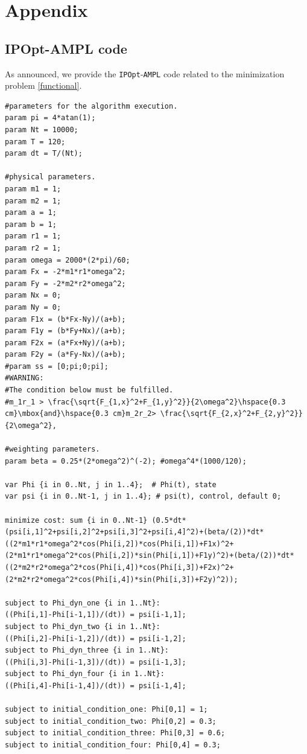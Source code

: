 \documentclass{aims}
\theoremstyle{definition}
\begin{document}
\newpage

\section*{Appendix}

\subsection{IPOpt-AMPL code}

As announced, we provide the \verb!IPOpt!-\verb!AMPL! code related to the minimization problem \eqref{functional}.

\begin{verbatim}
#parameters for the algorithm execution.
param pi = 4*atan(1);
param Nt = 10000;
param T = 120;
param dt = T/(Nt);

#physical parameters.
param m1 = 1;
param m2 = 1;
param a = 1;
param b = 1;
param r1 = 1;
param r2 = 1;
param omega = 2000*(2*pi)/60;
param Fx = -2*m1*r1*omega^2;
param Fy = -2*m2*r2*omega^2;
param Nx = 0;
param Ny = 0;
param F1x = (b*Fx-Ny)/(a+b);
param F1y = (b*Fy+Nx)/(a+b);
param F2x = (a*Fx+Ny)/(a+b);
param F2y = (a*Fy-Nx)/(a+b);
#param ss = [0;pi;0;pi];
#WARNING:
#The condition below must be fulfilled.
#m_1r_1 > \frac{\sqrt{F_{1,x}^2+F_{1,y}^2}}{2\omega^2}\hspace{0.3 cm}\mbox{and}\hspace{0.3 cm}m_2r_2> \frac{\sqrt{F_{2,x}^2+F_{2,y}^2}}{2\omega^2},

#weighting parameters.
param beta = 0.25*(2*omega^2)^(-2); #omega^4*(1000/120);

var Phi {i in 0..Nt, j in 1..4};  # Phi(t), state
var psi {i in 0..Nt-1, j in 1..4}; # psi(t), control, default 0;

minimize cost: sum {i in 0..Nt-1} (0.5*dt*(psi[i,1]^2+psi[i,2]^2+psi[i,3]^2+psi[i,4]^2)+(beta/(2))*dt*((2*m1*r1*omega^2*cos(Phi[i,2])*cos(Phi[i,1])+F1x)^2+(2*m1*r1*omega^2*cos(Phi[i,2])*sin(Phi[i,1])+F1y)^2)+(beta/(2))*dt*((2*m2*r2*omega^2*cos(Phi[i,4])*cos(Phi[i,3])+F2x)^2+(2*m2*r2*omega^2*cos(Phi[i,4])*sin(Phi[i,3])+F2y)^2));

subject to Phi_dyn_one {i in 1..Nt}:
((Phi[i,1]-Phi[i-1,1])/(dt)) = psi[i-1,1];
subject to Phi_dyn_two {i in 1..Nt}:
((Phi[i,2]-Phi[i-1,2])/(dt)) = psi[i-1,2];
subject to Phi_dyn_three {i in 1..Nt}:
((Phi[i,3]-Phi[i-1,3])/(dt)) = psi[i-1,3];
subject to Phi_dyn_four {i in 1..Nt}:
((Phi[i,4]-Phi[i-1,4])/(dt)) = psi[i-1,4];

subject to initial_condition_one: Phi[0,1] = 1;
subject to initial_condition_two: Phi[0,2] = 0.3;
subject to initial_condition_three: Phi[0,3] = 0.6;
subject to initial_condition_four: Phi[0,4] = 0.3;


\end{verbatim}
\end{document}

